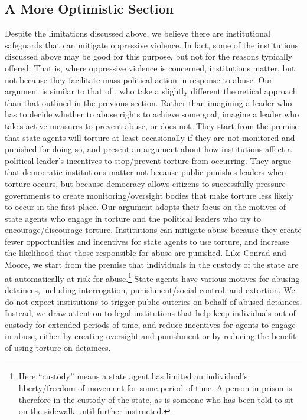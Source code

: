 \documentclass[12pt]{article}
\begin{document}
\subsection*{A More Optimistic Section}

Despite the limitations discussed above, we believe there are institutional safeguards that can mitigate oppressive violence. In fact, some of the institutions discussed above may be good for this purpose, but not for the reasons typically offered. That is, where oppressive violence is concerned, institutions matter, but not because they facilitate mass political action in response to abuse. Our argument is similar to that of \citet{ConradMoore2010}, who take a slightly different theoretical approach than that outlined in the previous section. Rather than imagining a leader who has to decide whether to abuse rights to achieve some goal, \citet{ConradMoore2010} imagine a leader who takes active measures to prevent abuse, or does not. They start from the premise that state agents will torture at least occasionally if they are not monitored and punished for doing so, and present an argument about how institutions affect a political leader's incentives to stop/prevent torture from occurring. They argue that democratic institutions matter not because public punishes leaders when torture occurs, but because democracy allows citizens to successfully pressure governments to create monitoring/oversight bodies that make torture less likely to occur in the first place. Our argument adopts their focus on the motives of state agents who engage in torture and the political leaders who try to encourage/discourage torture. Institutions can mitigate abuse because they create fewer opportunities and incentives for state agents to use torture, and increase the likelihood that those responsible for abuse are punished. Like Conrad and Moore, we start from the premise that individuals in the custody of the state are at automatically at risk for abuse.\footnote{Here ``custody'' means a state agent has limited an individual's liberty/freedom of movement for some period of time. A person in prison is therefore in the custody of the state, as is someone who has been told to sit on the sidewalk until further instructed.} State agents have various motives for abusing detainees, including interrogation, punishment/social control, and extortion. We do not expect institutions to trigger public outcries on behalf of abused detainees. Instead, we draw attention to legal institutions that help keep individuals out of custody for extended periods of time, and reduce incentives for agents to engage in abuse, either by creating oversight and punishment or by reducing the benefit of using torture on detainees. 
\end{document}
